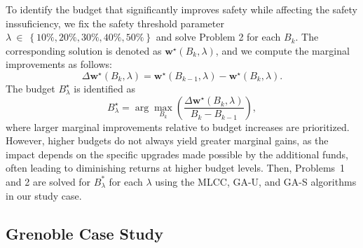 \documentclass[letterpaper, 10 pt, conference]{ieeeconf}  %
\begin{document}
To identify the budget that significantly improves safety while affecting the safety inssuficiency, we fix the safety threshold parameter $\lambda~\in~\left \{  10\%,20\%,30\%,40\%,50\% \right \}$ and solve Problem 2 for each $B_k$. The corresponding solution is denoted as $\mathbf{w}^{\star} (B_k, \lambda)$, and we compute the marginal improvements as follows:
    \begin{equation}
    \Delta \mathbf{w}^{\star} (B_k, \lambda) = \mathbf{w}^{\star}(B_{k-1}, \lambda) - \mathbf{w}^{\star}(B_{k}, \lambda).
    \end{equation}
The budget $B^{\star}_{\lambda}$ is identified as
\begin{equation}
\label{marginal}
B^{\star}_{\lambda} = \arg\max_{B_k} \left( \frac{\Delta \mathbf{w}^{\star} (B_k, \lambda)}{B_k - B_{k-1}} 
\right),    
\end{equation}
where larger marginal improvements relative to budget increases are prioritized. However, higher budgets do not always yield greater marginal gains, as the impact depends on the specific upgrades made possible by the additional funds, often leading to diminishing returns at higher budget levels. Then, Problems~1 and 2 are solved for $B^{\ast}_{\lambda}$ for each $\lambda$ using the MLCC, \mbox{GA-U}, and \mbox{GA-S} algorithms in our study case.






\subsection{Grenoble Case Study}
\end{document}
